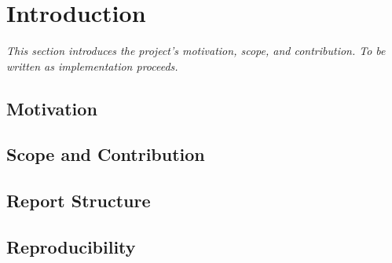 \chapter{Introduction}
\label{ch:introduction}

\textit{This section introduces the project's motivation, scope, and contribution.
To be written as implementation proceeds.}

\section{Motivation}
\section{Scope and Contribution}
\section{Report Structure}
\section{Reproducibility}